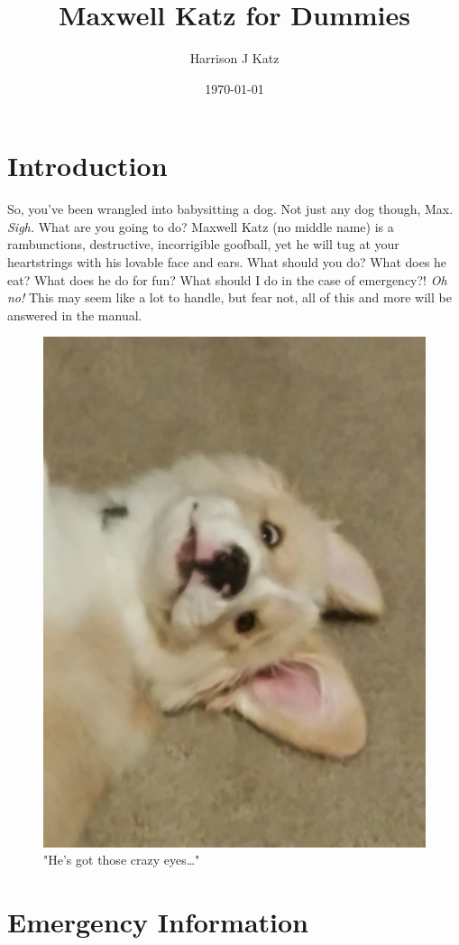 \documentclass[pdftex,12pt]{article}
\title{Maxwell Katz for Dummies}
\author{Harrison J Katz}
\date{\today}
\begin{document}



\newpage
\tableofcontents
{}

\newpage
{}

\section{Introduction}

So, you've been wrangled into babysitting a dog. Not just any dog though, Max.
\emph{Sigh.} What are you going to do? Maxwell Katz (no middle name) is a
rambunctions, destructive, incorrigible goofball, yet he will tug at your
heartstrings with his lovable face and ears. What should you do? What does he
eat? What does he do for fun? What should I do in the case of
emergency?! \emph{Oh no!} This may seem like a lot to handle, but fear not, 
all of this and more will be answered in the manual.

\bigskip

\begin{figure}[h!]
    \centering
    \includegraphics[width=.35\textwidth]{./images/max/crazy_eyes.jpg}
    \caption{"He's got those crazy eyes\ldots"}
    \label{fig:crazy_eyes}
\end{figure}

\newpage
\section{Emergency Information}
\end{document}
